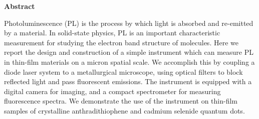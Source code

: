 \thispagestyle{plain}
\begin{center}
 
 
    \textbf{Abstract}
\end{center}

Photoluminescence (PL) is the process by which light is absorbed and re-emitted by a material. In solid-state physics, PL is an important characteristic measurement for studying the electron band structure of molecules. Here we report the design and construction of a simple instrument which can measure PL in thin-film materials on a micron spatial scale. We accomplish this by coupling a diode laser system to a metallurgical microscope, using optical filters to block reflected light and pass fluorescent emissions. The instrument is equipped with a digital camera for imaging, and a compact spectrometer for measuring fluorescence spectra. We demonstrate the use of the instrument on thin-film samples of crystalline anthradithiophene and cadmium selenide quantum dots.

